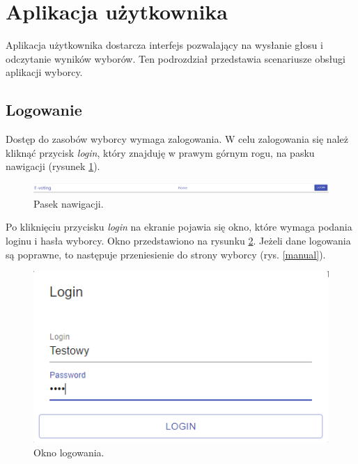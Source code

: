 \documentclass[a4paper,12pt]{book}
\begin{document}
\section{Aplikacja użytkownika}

Aplikacja użytkownika dostarcza interfejs pozwalający na wysłanie głosu i odczytanie wyników wyborów. Ten podrozdział przedstawia scenariusze obsługi aplikacji wyborcy.
 
\subsection{Logowanie}

Dostęp do zasobów wyborcy wymaga zalogowania. W celu zalogowania się należ kliknąć przycisk \textit{login}, który znajduję w prawym górnym rogu, na pasku nawigacji (rysunek \ref{navlogin}).

\begin{figure}[h]
	\centering
	\includegraphics[width=\textwidth]{images/navlogin.png}
	\caption{Pasek nawigacji.}\label{navlogin}
\end {figure}

Po kliknięciu przycisku \textit{login} na ekranie pojawia się okno, które wymaga podania loginu i hasła wyborcy. Okno przedstawiono na rysunku \ref{userlogin}. Jeżeli dane logowania są poprawne, to następuje przeniesienie do strony wyborcy (rys. \ref{manual}).
 
\begin{figure}[h]
	\centering
	\includegraphics{images/userlogin.png}
	\caption{Okno logowania.}\label{userlogin}
\end {figure}
\end{document}
